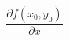 \newcommand{\partialdiff}[2]{ %
	\frac{\partial #1}{\partial #2} %
}
$$ \partialdiff{ f(x_0, y_0) }{ x } $$
